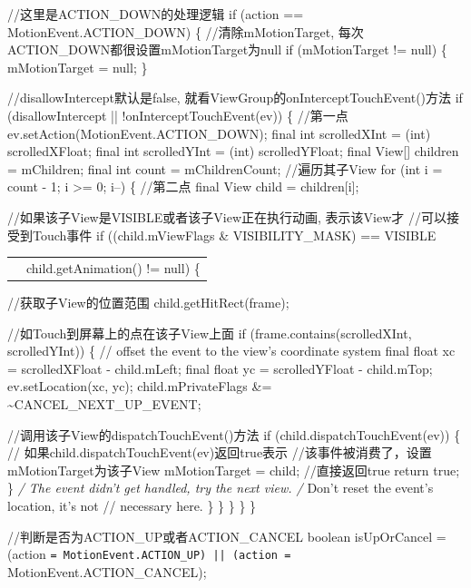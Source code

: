 \documentclass[9pt, b5paper]{article}
\begin{document}
//这里是ACTION\_DOWN的处理逻辑  
if (action == MotionEvent.ACTION\_DOWN) \{  
 //清除mMotionTarget, 每次ACTION\_DOWN都很设置mMotionTarget为null  
    if (mMotionTarget != null) \{  
        mMotionTarget = null;  
    \}  

//disallowIntercept默认是false, 就看ViewGroup的onInterceptTouchEvent()方法  
if (disallowIntercept || !onInterceptTouchEvent(ev)) \{  //第一点
    ev.setAction(MotionEvent.ACTION\_DOWN);  
    final int scrolledXInt = (int) scrolledXFloat;  
    final int scrolledYInt = (int) scrolledYFloat;  
    final View[] children = mChildren;  
    final int count = mChildrenCount;  
    //遍历其子View  
    for (int i = count - 1; i >= 0; i--) \{  //第二点
        final View child = children[i];  

//如果该子View是VISIBLE或者该子View正在执行动画, 表示该View才  
//可以接受到Touch事件  
if ((child.mViewFlags \& VISIBILITY\_MASK) == VISIBLE  
\begin{center}
\begin{tabular}{ll}
 & child.getAnimation() != null) \{\\
\end{tabular}
\end{center}
//获取子View的位置范围  
   child.getHitRect(frame);  

//如Touch到屏幕上的点在该子View上面  
if (frame.contains(scrolledXInt, scrolledYInt)) \{  
    // offset the event to the view's coordinate system  
    final float xc = scrolledXFloat - child.mLeft;  
    final float yc = scrolledYFloat - child.mTop;  
    ev.setLocation(xc, yc);  
    child.mPrivateFlags \&= \textasciitilde{}CANCEL\_NEXT\_UP\_EVENT;  

                    //调用该子View的dispatchTouchEvent()方法  
                    if (child.dispatchTouchEvent(ev))  \{  
                        // 如果child.dispatchTouchEvent(ev)返回true表示  
                     //该事件被消费了，设置mMotionTarget为该子View  
                        mMotionTarget = child;  
                        //直接返回true  
                        return true;  
                    \}  
                    \emph{/ The event didn't get handled, try the next view.  
                    /} Don't reset the event's location, it's not  
                    // necessary here.  
                \}  
            \}  
        \}  
    \}  
\}  

//判断是否为ACTION\_UP或者ACTION\_CANCEL  
boolean isUpOrCancel = (action \texttt{= MotionEvent.ACTION\_UP) ||  
               (action =} MotionEvent.ACTION\_CANCEL);  
\end{document}
